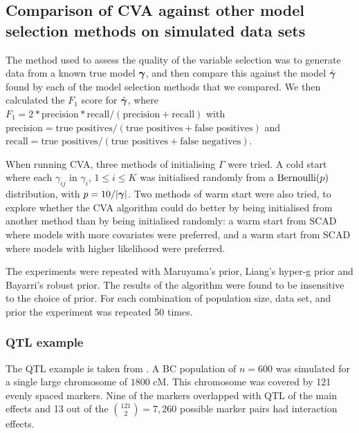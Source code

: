 \documentclass{amsart}[12pt]
\begin{document}
\subsection{Comparison of CVA against other model selection methods on simulated data sets}

	
		

The method used to assess the quality of the variable selection was to generate data from a known true model
${\boldsymbol \gamma}$,
and then compare this against the model $\hat{{\boldsymbol \gamma}}$ found by each of the model selection methods that we 
compared.
We then calculated the $F_1$ score for $\hat{{\boldsymbol \gamma}}$,
where
$F_1 = 2 * \text{precision} * \text{recall} / (\text{precision} + \text{recall})$ with
$\text{precision} = \text{true positives} / (\text{true positives} + \text{false positives})$ and
$\text{recall} = \text{true positives} / (\text{true positives} + \text{false negatives})$.

When running CVA,
three methods of initialising $\Gamma$ were tried.
A cold start where each $\gamma_{ij}$ in $\gamma_i$, $1 \leq i \leq K$ was initialised randomly from a
$\text{Bernoulli} (p)$ distribution, with $p = 10 / |{\boldsymbol \gamma}|$.
Two methods of warm start were also tried, to explore whether the CVA algorithm could do better by being
initialised from another method than by being initialised randomly: 
a warm start from SCAD where models with more covariates were preferred, and
a warm start from SCAD where models with higher likelihood were preferred.

The experiments were repeated with Maruyama's prior, Liang's hyper-g prior and Bayarri's robust prior.
The results of the algorithm were found to be insensitive to the choice of prior.
For each combination of population size, data set, and prior the experiment was repeated 50 times.

\subsubsection{QTL example}
The QTL example is taken from \cite{Xu2007}. A BC population of $n=600$ was simulated for a single large
chromosome of $1800$ cM. This chromosome was covered by 121 evenly spaced markers. Nine of the markers
overlapped with QTL of the main effects and 13 out of the $\binom{121} 2 = 7,260$ possible marker pairs had
interaction effects.
\end{document}
